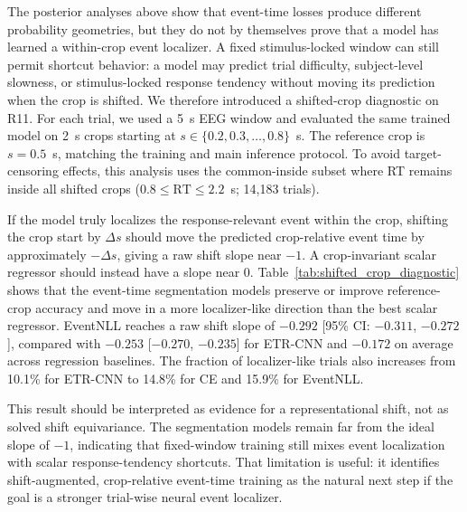 \documentclass[12pt]{article}
\begin{document}
The posterior analyses above show that event-time losses produce different probability geometries, but they do not by themselves prove that a model has learned a within-crop event localizer. A fixed stimulus-locked window can still permit shortcut behavior: a model may predict trial difficulty, subject-level slowness, or stimulus-locked response tendency without moving its prediction when the crop is shifted. We therefore introduced a shifted-crop diagnostic on R11. For each trial, we used a 5~s EEG window and evaluated the same trained model on 2~s crops starting at $s\in\{0.2,0.3,\dots,0.8\}$~s. The reference crop is $s=0.5$~s, matching the training and main inference protocol. To avoid target-censoring effects, this analysis uses the common-inside subset where RT remains inside all shifted crops ($0.8\leq \mathrm{RT}\leq 2.2$~s; 14{,}183 trials).

If the model truly localizes the response-relevant event within the crop, shifting the crop start by $\Delta s$ should move the predicted crop-relative event time by approximately $-\Delta s$, giving a raw shift slope near $-1$. A crop-invariant scalar regressor should instead have a slope near 0. Table~\ref{tab:shifted_crop_diagnostic} shows that the event-time segmentation models preserve or improve reference-crop accuracy and move in a more localizer-like direction than the best scalar regressor. EventNLL reaches a raw shift slope of $-0.292$ [95\% CI: $-0.311$, $-0.272$], compared with $-0.253$ [$-0.270$, $-0.235$] for ETR-CNN and $-0.172$ on average across regression baselines. The fraction of localizer-like trials also increases from 10.1\% for ETR-CNN to 14.8\% for CE and 15.9\% for EventNLL.

This result should be interpreted as evidence for a representational shift, not as solved shift equivariance. The segmentation models remain far from the ideal slope of $-1$, indicating that fixed-window training still mixes event localization with scalar response-tendency shortcuts. That limitation is useful: it identifies shift-augmented, crop-relative event-time training as the natural next step if the goal is a stronger trial-wise neural event localizer.
\end{document}
